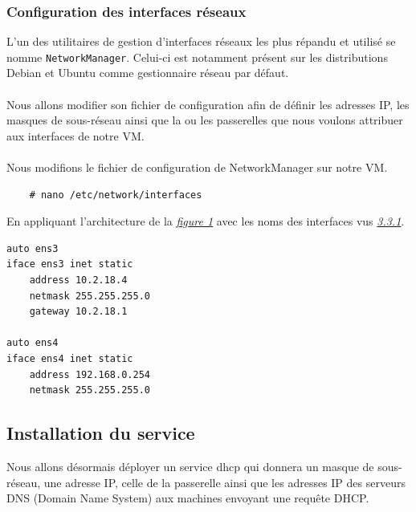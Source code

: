 \documentclass[a4paper]{article}
\begin{document}
\subsubsection{Configuration des interfaces réseaux}
L'un des utilitaires de gestion d'interfaces réseaux les plus répandu et utilisé se nomme \verb|NetworkManager|. Celui-ci est notamment présent sur les distributions Debian et Ubuntu comme gestionnaire réseau par défaut.\\\\Nous allons modifier son fichier de configuration afin de définir les adresses IP, les masques de sous-réseau ainsi que la ou les passerelles que nous voulons attribuer aux interfaces de notre VM.\\\\Nous modifions le fichier de configuration de NetworkManager sur notre VM.
\begin{lstlisting}
    # nano /etc/network/interfaces
\end{lstlisting}
En appliquant l'architecture de la \hyperref[sec:rzo]{\textit{figure 1}} avec les noms des interfaces vus \hyperref[sec:sec02]{\textit{3.3.1}}.
\begin{lstlisting}
auto ens3
iface ens3 inet static
    address 10.2.18.4
    netmask 255.255.255.0
    gateway 10.2.18.1
    
auto ens4
iface ens4 inet static
    address 192.168.0.254
    netmask 255.255.255.0
\end{lstlisting}
\subsection{Installation du service}
Nous allons désormais déployer un service dhcp qui donnera un masque de sous-réseau, une adresse IP, celle de la passerelle ainsi que les adresses IP des serveurs DNS (Domain Name System) aux machines envoyant une requête DHCP.
\end{document}

